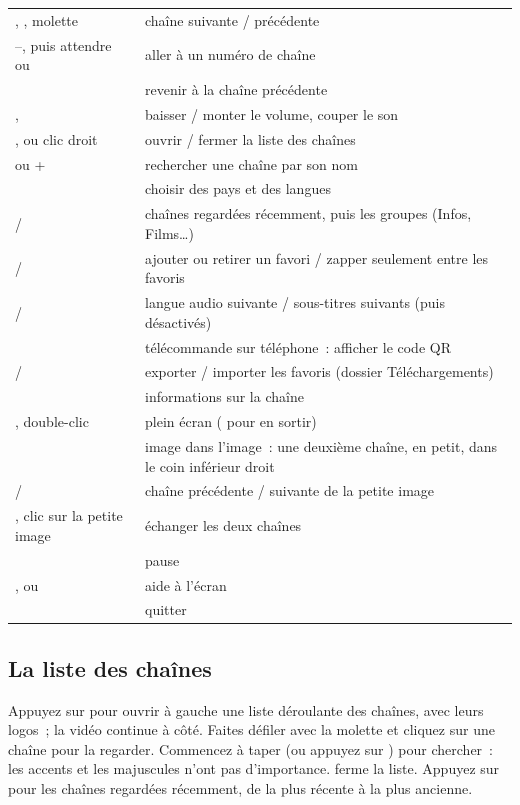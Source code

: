\begin{xltabular}{\linewidth}{@{}KX@{}}
\key{$\uparrow$} \key{$\downarrow$},  , molette & chaîne suivante / précédente \\
--, puis attendre ou  & aller à un numéro de chaîne \\
 & revenir à la chaîne précédente \\
\key{$\leftarrow$} \key{$\rightarrow$},  & baisser / monter le volume, couper le son \\
,  ou clic droit & ouvrir / fermer la liste des chaînes \\
\key{/} ou + & rechercher une chaîne par son nom \\
 & choisir des pays et des langues \\
 /  & chaînes regardées récemment, puis les groupes (Infos, Films\ldots) \\
 /  & ajouter ou retirer un favori / zapper seulement entre les favoris \\
 /  & langue audio suivante / sous-titres suivants (puis désactivés) \\
 & télécommande sur téléphone~: afficher le code QR \\
 /  & exporter / importer les favoris (dossier Téléchargements) \\
 & informations sur la chaîne \\
, double-clic & plein écran ( pour en sortir) \\
 & image dans l'image~: une deuxième chaîne, en petit, dans le coin inférieur droit \\
\key{[} / \key{]} & chaîne précédente / suivante de la petite image \\
, clic sur la petite image & échanger les deux chaînes \\
 & pause \\
,  ou  & aide à l'écran \\
 & quitter \\
\bottomrule
\end{xltabular}

\subsection{La liste des chaînes}
Appuyez sur  pour ouvrir à gauche une liste déroulante des chaînes,
avec leurs logos~; la vidéo continue à côté. Faites défiler avec la molette
et cliquez sur une chaîne pour la regarder. Commencez à taper (ou appuyez sur
\key{/}) pour chercher~: les accents et les majuscules n'ont pas
d'importance.  ferme la liste. Appuyez sur  pour les
chaînes regardées récemment, de la plus récente à la plus ancienne.

